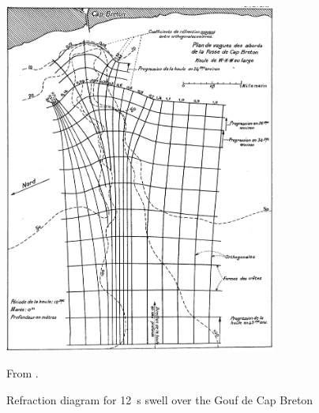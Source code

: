 \begin{figure}
\centerline{\includegraphics[width=0.8\textwidth]{FIGS_CH_SHALLOWLIN/Cap_Breton.png}}
  \caption{Refraction diagram for 12~s swell over the Gouf de Cap Breton}{From \cite{Lacombe1950}.}  
   \label{RaysCapBreton}
  \end{figure}

